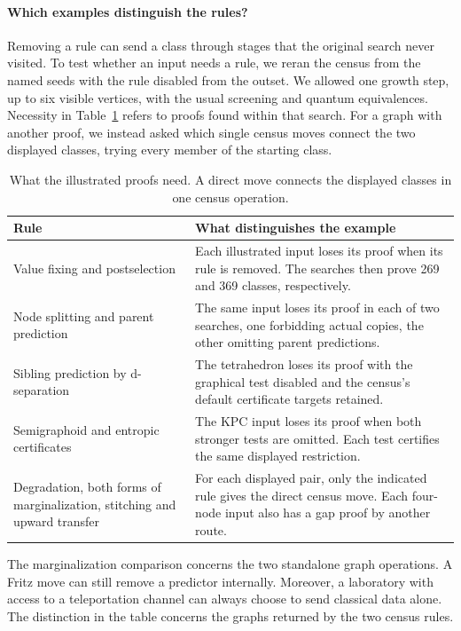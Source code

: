 \paragraph{Which examples distinguish the rules?}
Removing a rule can send a class through stages that the original search
never visited. To test whether an input needs a rule, we reran the census
from the named seeds with the rule disabled from the outset. We allowed
one growth step, up to six visible vertices, with the usual screening and
quantum equivalences. Necessity in Table~\ref{tab:examples} refers to
proofs found within that search. For a graph with another proof, we
instead asked which single census moves connect the two displayed
classes, trying every member of the starting class.

\begin{table}[htbp]
\centering
\caption{What the illustrated proofs need. A direct move connects the
displayed classes in one census operation.}\label{tab:examples}
\begin{tabular}{@{}>{\raggedright\arraybackslash}p{.36\linewidth}>{\raggedright\arraybackslash}p{.58\linewidth}@{}}
\toprule
Rule & What distinguishes the example\\
\midrule
Value fixing and postselection &
Each illustrated input loses its proof when its rule is removed.
The searches then prove 269 and 369 classes, respectively.\\
Node splitting and parent prediction &
The same input loses its proof in each of two searches, one forbidding
actual copies, the other omitting parent predictions.\\
Sibling prediction by d-separation &
The tetrahedron loses its proof with the graphical test disabled and
the census's default certificate targets retained.\\
Semigraphoid and entropic certificates &
The KPC input loses its proof when both stronger tests are omitted.
Each test certifies the same displayed restriction.\\
Degradation, both forms of marginalization, stitching and upward transfer &
For each displayed pair, only the indicated rule gives the direct census
move. Each four-node input also has a gap proof by another route.\\
\bottomrule
\end{tabular}
\end{table}

The marginalization comparison concerns the two standalone graph
operations. A Fritz move can still remove a predictor internally.
Moreover, a laboratory with access to a teleportation channel can always
choose to send classical data alone. The distinction in the table
concerns the graphs returned by the two census rules.

